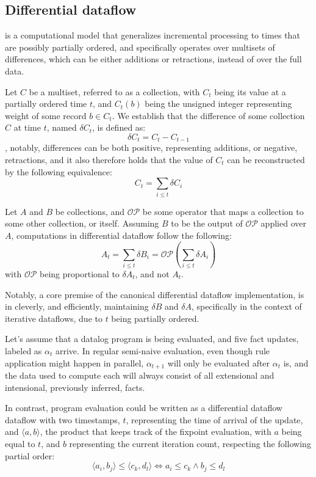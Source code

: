 \documentclass[sigconf,screen,review,natbib]{acmart}
\theoremstyle{definition}
\begin{document}
\subsection{Differential dataflow} is a computational model that generalizes incremental processing to
times that are possibly partially ordered, and specifically operates over multisets of differences, which
can be either additions or retractions, instead of over the full data.

Let $C$ be a multiset, referred to as a collection, with $C_t$ being its value at a partially ordered
time $t$, and $C_t(b)$ being the unsigned integer representing weight of some record $b \in C_t$. We
establish that the difference of some collection $C$ at time $t$, named $\delta C_t$, is defined as: \[\delta C_t = C_t - C_{t - 1}\],
notably, differences can be both positive, representing additions, or negative, retractions, and it
also therefore holds that the value of $C_t$ can be reconstructed by the following equivalence: \[C_t = \sum_{i \leq t}\delta C_{i}\]

Let $A$ and $B$ be collections, and $\mathcal{OP}$ be some operator that maps a collection to some other
collection, or itself. Assuming $B$ to be the output of $\mathcal{OP}$ applied over $A$, computations in
differential dataflow follow the following: \[A_t = \sum_{i \leq t} \delta B_i = \mathcal{OP}(\sum_{i \leq t} \delta A_i)\]
with $\mathcal{OP}$ being proportional to $\delta A_t$, and not $A_t$.

Notably, a core premise of the canonical differential dataflow implementation, is in cleverly, and efficiently,
maintaining $\delta B$ and $\delta A$, specifically in the context of iterative dataflows, due to $t$ being
partially ordered.

Let's assume that a datalog program is being evaluated, and five fact updates, labeled as $\alpha_t$ arrive. In
regular semi-naive evaluation, even though rule application might happen in parallel, $\alpha_{t + 1}$ will only be
evaluated after $\alpha_{t}$ is, and the data used to compute each will always consist of all extensional and
intensional, previously inferred, facts.

In contrast, program evaluation could be written as a differential dataflow dataflow with two timestamps, $t$,
representing the time of arrival of the update, and $\langle a, b \rangle$, the product that keeps track of the
fixpoint evaluation, with $a$ being equal to $t$, and $b$ representing the current iteration count, respecting
the following partial order: \[\langle a_i, b_j \rangle \leq \langle c_k, d_l \rangle \iff a_i \leq c_k \wedge b_j \leq d_l\]
\end{document}
